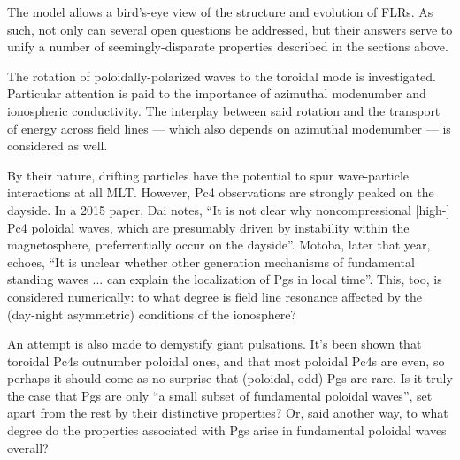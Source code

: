 The model allows a bird's-eye view of the structure and evolution of FLRs. As
such, not only can several open questions be addressed, but their answers serve
to unify a number of seemingly-disparate properties described in the sections
above. 

The rotation of poloidally-polarized waves to the toroidal mode is
investigated. Particular attention is paid to the importance of azimuthal
modenumber and ionospheric conductivity. The interplay between said rotation
and the transport of energy across field lines --- which also depends on
azimuthal modenumber --- is considered as well. 

By their nature, drifting particles have the potential to spur wave-particle
interactions at all MLT. However, Pc4 observations are strongly peaked on the
dayside. In a 2015 paper, Dai notes, ``It is not clear why noncompressional
[high-\azm] Pc4 poloidal waves, which are presumably driven by instability
within the magnetosphere, preferrentially occur on the
dayside''\cite{dai_2015}. Motoba, later that year, echoes, ``It is unclear
whether other generation mechanisms of fundamental standing waves ... can
explain the localization of Pgs in local time''\cite{motoba_2015}. This, too,
is considered numerically: to what degree is field line resonance affected by
the (day-night asymmetric) conditions of the ionosphere? 

An attempt is also made to demystify giant pulsations. It's been shown that
toroidal Pc4s outnumber poloidal ones, and that most poloidal Pc4s are even, so
perhaps it should come as no surprise that (poloidal, odd) Pgs are rare. Is it
truly the case that Pgs are only ``a small subset of fundamental poloidal
waves''\cite{takahashi_2013}, set apart from the rest by their distinctive
properties? Or, said another way, to what degree do the properties
associated with Pgs arise in fundamental poloidal waves overall? 




